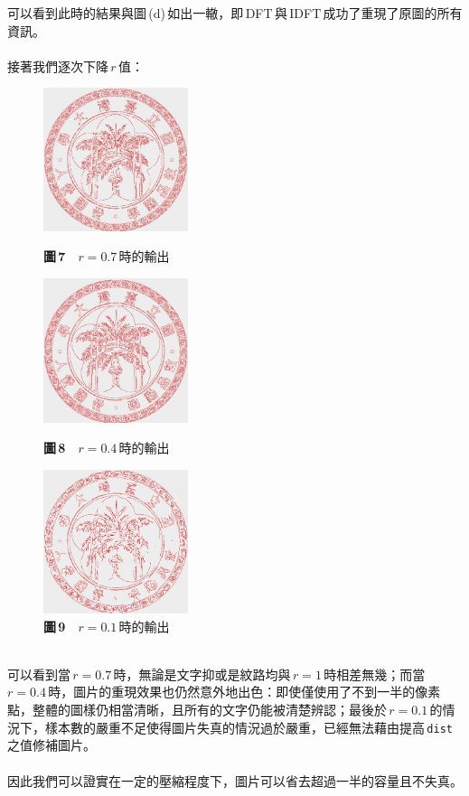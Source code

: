  \noindent 可以看到此時的結果與圖\,(d)\,如出一轍，即\,DFT\,與\,IDFT\,成功了重現了原圖的所有資訊。
  \\\\
  接著我們逐次下降\,\(r\)\,值：\noindent
  \begin{figure}[h!]
  \centering
    \begin{minipage}{0.3\linewidth}
      \centering
      \includegraphics[width=120pt]{NTU r=0.7.jpg}
      \caption*{\textbf{圖\,7}\(\quad\)\(r=0.7\)\,時的輸出}
    \end{minipage}
    \quad
    \begin{minipage}{0.3\linewidth}
      \centering
      \includegraphics[width=120pt]{NTU r=0.4.jpg}
      \caption*{\textbf{圖\,8}\(\quad\)\(r=0.4\)\,時的輸出}
    \end{minipage}
    \quad
    \begin{minipage}{0.3\linewidth}
      \centering
      \includegraphics[width=120pt]{NTU r=0.1.jpg}
      \caption*{\textbf{圖\,9}\(\quad\)\(r=0.1\)\,時的輸出}
    \end{minipage}
  \end{figure}
  \noindent \\
  可以看到當\,\(r=0.7\)\,時，無論是文字抑或是紋路均與\,\(r=1\)\,時相差無幾；而當\,\(r=0.4\)\,時，圖片的重現效果也仍然意外地出色：即使僅使用了不到一半的像素點，整體的圖樣仍相當清晰，且所有的文字仍能被清楚辨認；最後於\,\(r=0.1\)\,的情況下，樣本數的嚴重不足使得圖片失真的情況過於嚴重，已經無法藉由提高\,\texttt{dist}\,之值修補圖片。
  \\\\
  因此我們可以證實在一定的壓縮程度下，圖片可以省去超過一半的容量且不失真。
  